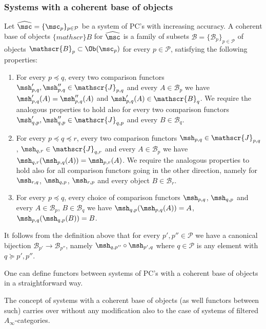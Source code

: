 \subsubsection{Systems with a coherent base of
  objects} \label{sbsb:sys-base} Let
$\widehat{\msc} = \{\msc_p\}_{p \in \mathcal{P}}$ be a system of PC's
with increasing accuracy. A coherent base of objects $\{mathscr\}{B}$ for
$\widehat{\msc}$ is a family of subsets
  $\mathscr{B} = \{\mathscr{B}_p\}_{p \in \mathcal{P}}$ of objects
  $\mathscr{B}_p \subset \Ob(\msc_p)$ for every $p \in \mathcal{P}$,
satisfying the following properties:
\begin{enumerate}
\item For every $p \preceq q$, every two comparison functors
  $\msh'_{p,q}, \msh''_{p,q} \in \mathscr{J}_{p,q}$ and every
  $A \in \mathscr{B}_p$ we have $\msh'_{p,q}(A) = \msh''_{p,q}(A)$ and
  $\msh'_{p,q}(A) \in \mathscr{B}_q$. We require the analogous
  properties to hold also for every two comparison functors
  $\msh'_{q,p}, \msh''_{q,p} \in \mathscr{J}_{q,p}$ and every
  $B \in \mathscr{B}_q$.
\item For every $p \preceq q \preceq r$, every two comparison functors
  $\msh_{p,q} \in \mathscr{J}_{p,q}$,
  $\msh_{q,r} \in \mathscr{J}_{q,r}$ and every $A \in \mathscr{B}_p$
  we have $\msh_{q,r}(\msh_{p,q}(A)) = \msh_{p,r}(A)$. We require the
  analogous properties to hold also for all comparison functors going
  in the other direction, namely for $\msh_{r,q}$, $\msh_{q,p}$,
  $\msh_{r,p}$ and
  every object $B \in \mathscr{B}_r$.
\item For every $p \preceq q$, every choice of comparison functors
  $\msh_{p,q}$, $\msh_{q,p}$ and every $A \in \mathscr{B}_p$,
  $B \in \mathscr{B}_q$ we have $\msh_{q,p}(\msh_{p,q}(A)) = A$,
  $\msh_{p,q}(\msh_{q,p}(B)) = B$.
\end{enumerate}
It follows from the definition above that for every
$p', p'' \in \mathcal{P}$ we have a canonical bijection
$\mathscr{B}_{p'} \longrightarrow \mathcal{B}_{p''}$, namely
$\msh_{q, p''} \circ \msh_{p', q}$ where $q \in \mathcal{P}$ is any
element with $q \succeq p', p''$.

One can define functors between systems of PC's with a coherent base
of objects in a straightforward way.

The concept of systems with a coherent base of objects (as well
functors between such) carries over without any modification also to
the case of systems of filtered $A_{\infty}$-categories.

